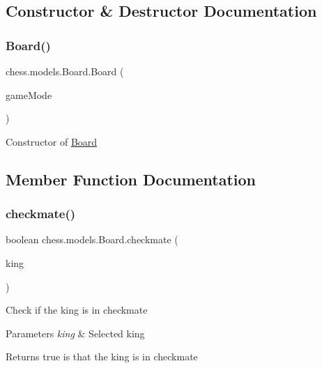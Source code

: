 \subsection{Constructor \& Destructor Documentation}
\mbox{\label{classchess_1_1models_1_1_board_aa18d91c193768584a714d739a0dc80af}} 
\subsubsection{\texorpdfstring{Board()}{Board()}}
{\footnotesize\ttfamily chess.\+models.\+Board.\+Board (\begin{DoxyParamCaption}\item[{\mbox{\hyperlink{enumchess_1_1models_1_1enums_1_1_game_mode}{Game\+Mode}}}]{game\+Mode }\end{DoxyParamCaption})}

Constructor of \mbox{\hyperlink{classchess_1_1models_1_1_board}{Board}} 

\subsection{Member Function Documentation}
\mbox{\label{classchess_1_1models_1_1_board_a7268e3609f458bc8acd92b43727ca63d}} 
\subsubsection{\texorpdfstring{checkmate()}{checkmate()}}
{\footnotesize\ttfamily boolean chess.\+models.\+Board.\+checkmate (\begin{DoxyParamCaption}\item[{\mbox{\hyperlink{classchess_1_1models_1_1_chess_piece}{Chess\+Piece}}}]{king }\end{DoxyParamCaption})}

Check if the king is in checkmate


\begin{DoxyParams}{Parameters}
{\em king} & Selected king \\
\hline
\end{DoxyParams}
\begin{DoxyReturn}{Returns}
true is that the king is in checkmate 
\end{DoxyReturn}
\mbox{\label{classchess_1_1models_1_1_board_a013a001cb8edfdd61272275d210609fd}} 
